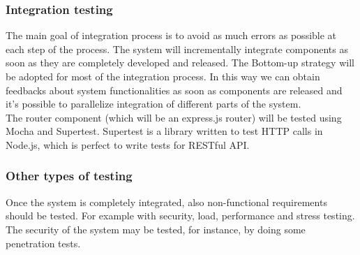 \documentclass{article}
\begin{document}
\subsubsection{Integration testing}
The main goal of integration process is to avoid as much errors as possible at each step of the process. 
The system will incrementally integrate components as soon as they are completely developed and released.
The Bottom-up strategy will be adopted for most of the integration process. In this way we can obtain feedbacks about system
functionalities as soon as components are released and it's possible to parallelize integration of different parts of the system.\\
The router component (which will be an express.js router) will be tested using Mocha and Supertest. 
Supertest is a library written to test HTTP calls in Node.js, which is perfect to write tests for RESTful API.

\subsubsection{Other types of testing}
Once the system is completely integrated, also non-functional requirements should be tested.
For example with security, load, performance and stress testing. \\
The security of the system may be tested, for instance, by doing some penetration tests.

\newpage
\end{document}

